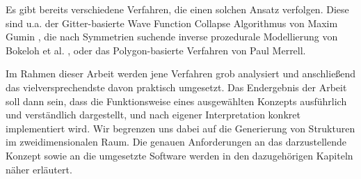 Es gibt bereits verschiedene Verfahren, die einen solchen Ansatz verfolgen. Diese sind u.a. der Gitter-basierte Wave Function
Collapse Algorithmus von Maxim Gumin \cite{45_gumin}, die nach Symmetrien suchende inverse prozedurale Modellierung von Bokeloh
et al. \cite{3_bokeloh_et_al}, oder das Polygon-basierte Verfahren von Paul Merrell. \cite{1_merrell}

Im Rahmen dieser Arbeit werden jene Verfahren grob analysiert und anschließend das vielversprechendste davon praktisch umgesetzt. Das Endergebnis
der Arbeit soll dann sein, dass die Funktionsweise eines ausgewählten Konzepts ausführlich und verständlich dargestellt, und nach eigener
Interpretation konkret implementiert wird. Wir begrenzen uns dabei auf die Generierung von Strukturen im zweidimensionalen Raum. Die genauen
Anforderungen an das darzustellende Konzept sowie an die umgesetzte Software werden in den dazugehörigen Kapiteln näher erläutert.